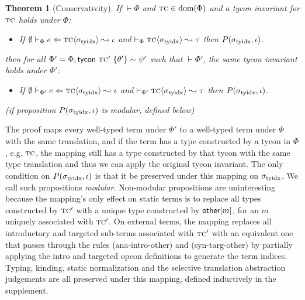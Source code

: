 \documentclass[10pt,preprint]{sigplanconf}
\newtheorem{theorem}{Theorem}
\newenvironment{proof-sketch}{\noindent{\emph{Proof Sketch.}}}{\qed}
\begin{document}
\begin{theorem}[Conservativity] If $\vdash \Phi$ and $\textsc{tc} \in \text{dom}(\Phi)$ and a tycon invariant for $\textsc{tc}$ holds under $\Phi$: \begin{itemize}
\item If $\emptyset \vdash_{\Phi} e \Leftarrow {\textsc{tc}}\langle\sigma_\text{tyidx}\rangle \leadsto \iota$ and $\vdash_\Phi {{\textsc{tc}}\langle\sigma_\text{tyidx}\rangle} \leadsto \tau$  then $P(\sigma_\text{tyidx}, \iota)$.
\end{itemize} then for all $\Phi' = \Phi, {\sf tycon}~\textsc{tc}' ~\{\theta'\} \sim \psi'$ such that $\vdash \Phi'$, the same tycon invariant holds under $\Phi'$: \begin{itemize}
\item If $\emptyset \vdash_{\Phi'} e \Leftarrow {\textsc{tc}}\langle\sigma_\text{tyidx}\rangle \leadsto \iota$ and $\vdash_{\Phi'}{{\textsc{tc}}\langle\sigma_\text{tyidx}\rangle}\leadsto{\tau}$ then $P(\sigma_\text{tyidx}, \iota)$.
\end{itemize}
(if proposition $P(\sigma_\text{tyidx}, \iota)$ is \emph{modular}, defined below)
\end{theorem}
\begin{proof-sketch}
The proof maps every well-typed term under $\Phi'$ to a well-typed term under $\Phi$ with the same translation, and if the term has a type constructed by a tycon in $\Phi$, e.g. $\textsc{tc}$, the mapping still has a type constructed by that tycon with the same type translation and thus we can apply the original tycon invariant. The only condition on $P(\sigma_\text{tyidx}, \iota)$ is that it be preserved under this mapping on $\sigma_\text{tyidx}$. We call such propositions \emph{modular}. Non-modular propositions are  uninteresting because the mapping's only effect on static terms is to replace all types constructed by $\textsc{tc}'$ with a unique type constructed by ${\sf other}[m]$, for an $m$ uniquely associated with $\textsc{tc}'$. On external terms, the mapping replaces all introductory and targeted sub-terms associated with $\textsc{tc}'$ with an equivalent one that passes through the rules (ana-intro-other) and (syn-targ-other) by partially applying the intro and targeted opcon definitions to generate the term indices. Typing, kinding, static normalization and the selective translation abstraction judgements are all preserved under this mapping, defined inductively in the supplement. \end{proof-sketch}
\end{document}
